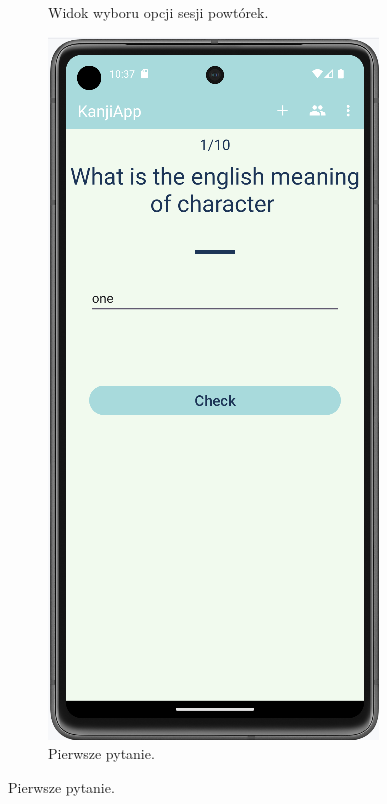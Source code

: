 \documentclass[a4paper,twoside,12pt]{book}
\begin{document}
\begin{figure}
\begin{subfigure}{0.3\textwidth}
   \caption{Widok wyboru opcji sesji powtórek.}
   \label{fig:options}
\end{subfigure}
\hfill
\begin{subfigure}{0.3\textwidth}
   \includegraphics[width=\textwidth]{learn/start}
   \caption{Pierwsze pytanie.}
   \label{fig:start}
\end{subfigure}


\end{figure}
\end{document}
